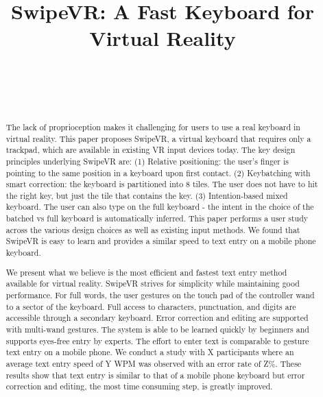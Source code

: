 \documentclass{sigchi}
\def\plaintitle{SwipeVR: A Fast Keyboard for Virtual Reality}
\begin{document}
\title{\plaintitle}

\author{%
  \\
  \\
  \\
}

\maketitle

\begin{abstract}
The lack of proprioception makes it challenging for users to use a real keyboard in virtual reality.
This paper proposes SwipeVR, a virtual keyboard that requires only a trackpad, which are available in existing VR input devices today.  The key design principles underlying SwipeVR are: (1) Relative positioning: the user's finger is pointing to the same position in a keyboard upon first contact.
(2) Keybatching with smart correction: the keyboard is partitioned into 8 tiles.  The user does not have to hit the right key, but just the tile that contains the key.
(3) Intention-based mixed keyboard.  The user can also type on the full keyboard - the intent in the choice of the batched vs full keyboard is automatically inferred.
This paper performs a user study across the various design choices as well as existing input methods.
We found that SwipeVR is easy to learn and provides a similar speed to text entry on a mobile phone keyboard.



We present what we believe is the most efficient and fastest text entry method available for virtual reality.
SwipeVR strives for simplicity while maintaining good performance.
For full words, the user gestures on the touch pad of the controller wand to a sector of the keyboard.
Full access to characters, punctuation, and digits are accessible through a secondary keyboard.
Error correction and editing are supported with multi-wand gestures.
The system is able to be learned quickly by beginners and supports eyes-free entry by experts.
The effort to enter text is comparable to gesture text entry on a mobile phone.
We conduct a study with X participants where an average text entry speed of Y WPM was observed with an error rate of Z\%.  
These results show that text entry is similar to that of a mobile phone keyboard but error correction and editing, the most time consuming step, is greatly improved.




\end{abstract}
\end{document}

